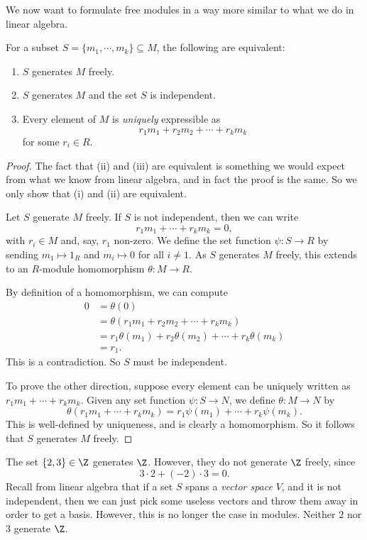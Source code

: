 \documentclass[a4paper]{article}
\begin{document}
We now want to formulate free modules in a way more similar to what we do in linear algebra.
\begin{prop}
  For a subset $S = \{m_1, \cdots, m_k\} \subseteq M$, the following are equivalent:
  \begin{enumerate}
    \item $S$ generates $M$ freely.
    \item $S$ generates $M$ and the set $S$ is independent.
    \item Every element of $M$ is \emph{uniquely} expressible as
      \[
        r_1 m_1 + r_2 m_2 + \cdots + r_k m_k
      \]
      for some $r_i \in R$.
  \end{enumerate}
\end{prop}
\begin{proof}
  The fact that (ii) and (iii) are equivalent is something we would expect from what we know from linear algebra, and in fact the proof is the same. So we only show that (i) and (ii) are equivalent.

  Let $S$ generate $M$ freely. If $S$ is not independent, then we can write
  \[
    r_1 m_1 + \cdots + r_k m_k = 0,
  \]
  with $r_i \in M$ and, say, $r_1$ non-zero. We define the set function $\psi: S \to R$ by sending $m_1 \mapsto 1_R$ and $m_i \mapsto 0$ for all $i \not= 1$. As $S$ generates $M$ freely, this extends to an $R$-module homomorphism $\theta: M \to R$.

  By definition of a homomorphism, we can compute
  \begin{align*}
    0 &= \theta(0)\\
    &= \theta(r_1 m_1 + r_2 m_2 + \cdots + r_k m_k) \\
    &= r_1\theta(m_1) + r_2 \theta(m_2) + \cdots + r_k \theta(m_k)\\
    &= r_1.
  \end{align*}
  This is a contradiction. So $S$ must be independent.

  To prove the other direction, suppose every element can be uniquely written as $r_1m_1 + \cdots + r_k m_k$. Given any set function $\psi: S \to N$, we define $\theta: M \to N$ by
  \[
    \theta(r_1m_1 + \cdots + r_k m_k) = r_1 \psi(m_1) + \cdots + r_k \psi(m_k).
  \]
  This is well-defined by uniqueness, and is clearly a homomorphism. So it follows that $S$ generates $M$ freely.
\end{proof}

\begin{eg}
  The set $\{2, 3\} \in \Z$ generates $\Z$. However, they do not generate $\Z$ freely, since
  \[
    3\cdot 2 + (-2) \cdot 3 = 0.
  \]
  Recall from linear algebra that if a set $S$ spans a \emph{vector space} $V$, and it is not independent, then we can just pick some useless vectors and throw them away in order to get a basis. However, this is no longer the case in modules. Neither $2$ nor $3$ generate $\Z$.
\end{eg}
\end{document}
